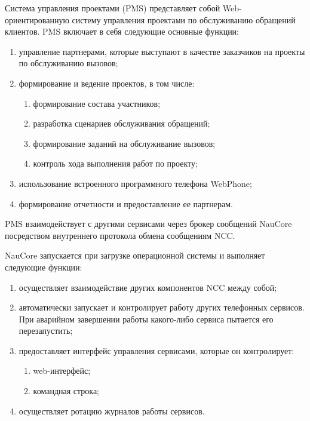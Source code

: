 Система управления проектами (PMS) представляет собой Web-ориентированную систему
управления проектами по обслуживанию обращений клиентов.
PMS включает в себя следующие основные функции:
\begin{enumerate}
    \item управление партнерами, которые выступают в качестве заказчиков на проекты по обслуживанию вызовов;
    \item формирование и ведение проектов, в том числе:
    \begin{enumerate}
        \item формирование состава участников;
        \item разработка сценариев обслуживания обращений;
        \item формирование заданий на обслуживание вызовов;
        \item контроль хода выполнения работ по проекту;
    \end{enumerate}
    \item использование встроенного программного телефона WebPhone;
    \item формирование отчетности и предоставление ее партнерам.
\end{enumerate}

PMS взаимодействует с другими сервисами через брокер сообщений NauCore посредством внутреннего протокола обмена сообщениям NCC.

NauCore запускается при загрузке операционной системы и выполняет следующие функции:
\begin{enumerate}
    \item осуществляет взаимодействие других компонентов NCC между собой;
    \item автоматически запускает и контролирует работу других телефонных сервисов. При аварийном завершении работы какого-либо сервиса пытается его перезапустить;
    \item предоставляет интерфейс управления сервисами, которые он контролирует:
    \begin{enumerate}
        \item web-интерфейс;
        \item командная строка;
    \end{enumerate}
    \item осуществляет ротацию журналов работы сервисов.
\end{enumerate}


